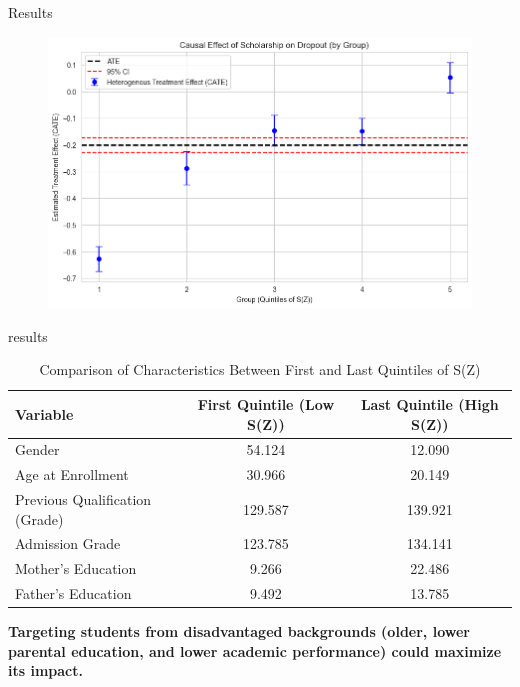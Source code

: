 \documentclass[aspectratio=169]{beamer}
\begin{document}
\begin{frame}{ Results}

\begin{figure}[h!]  
        \includegraphics[width=1\linewidth]{Tex_Pictures/HE_quintile_dropout.png}

 \end{figure}   
\end{frame}



\begin{frame}{results}
\begin{table}[h]
    \centering
    \begin{tabular}{l c c}
        \hline
        \textbf{Variable} & \textbf{First Quintile (Low S(Z))} & \textbf{Last Quintile (High S(Z))} \\
        \hline
        Gender & 54.124 & 12.090 \\
        Age at Enrollment & 30.966 & 20.149 \\
        Previous Qualification (Grade) & 129.587 & 139.921 \\
        Admission Grade & 123.785 & 134.141 \\
        Mother’s Education & 9.266 & 22.486 \\
        Father’s Education & 9.492 & 13.785 \\
        \hline
    \end{tabular}
    \caption{Comparison of Characteristics Between First and Last Quintiles of S(Z)}
    \label{tab:quintile_comparison}
\end{table}




 \textbf{Targeting students from disadvantaged backgrounds (older, lower parental education, and lower academic performance) could maximize its impact.}
\end{frame}
\end{document}
